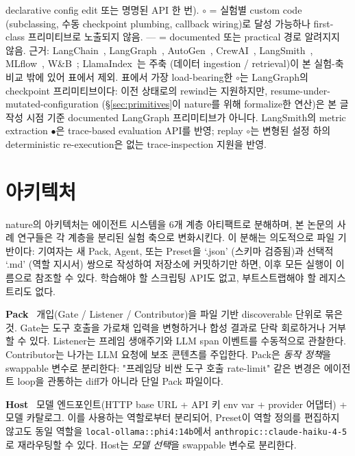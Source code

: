 \documentclass[11pt,a4paper]{article}
\begin{document}
\begin{table}[H]
{declarative config edit 또는 명명된 API 한 번). $\circ$ =
실험별 custom code (subclassing, 수동 checkpoint plumbing,
callback wiring)로 달성 가능하나 first-class 프리미티브로
노출되지 않음. --- = documented 또는 practical 경로 알려지지 않음.
근거: LangChain~\cite{langchain}, LangGraph~\cite{langgraph},
AutoGen~\cite{autogen}, CrewAI~\cite{crewai},
LangSmith~\cite{langsmith}, MLflow~\cite{mlflow},
W\&B~\cite{wandb}; LlamaIndex~\cite{llamaindex}는 주축 (데이터
ingestion / retrieval)이 본 실험-축 비교 밖에 있어 표에서 제외.
표에서 가장 load-bearing한 $\circ$는 LangGraph의 checkpoint
프리미티브이다: 이전 상태로의 rewind는 지원하지만, resume-under-
mutated-configuration (\S\ref{sec:primitives}이 nature를 위해
formalize한 연산)은 본 글 작성 시점 기준 documented LangGraph
프리미티브가 아니다. LangSmith의 metric extraction $\bullet$은
trace-based evaluation API를 반영; replay $\circ$는 변형된 설정
하의 deterministic re-execution은 없는 trace-inspection 지원을
반영.}
\label{tab:related-comparison}
\end{table}

\section{아키텍처}
\label{sec:architecture}

nature의 아키텍처는 에이전트 시스템을 6개 계층 아티팩트로 분해하며,
본 논문의 사례 연구들은 각 계층을 분리된 실험 축으로 변화시킨다. 이
분해는 의도적으로 파일 기반이다: 기여자는 새 Pack, Agent, 또는 Preset을
`.json' (스키마 검증됨)과 선택적 `.md' (역할 지시서) 쌍으로 작성하여
저장소에 커밋하기만 하면, 이후 모든 실행이 이름으로 참조할 수 있다.
학습해야 할 스크립팅 API도 없고, 부트스트랩해야 할 레지스트리도 없다.

\textbf{Pack} \textemdash\ 개입(Gate / Listener / Contributor)을 파일 기반
discoverable 단위로 묶은 것. Gate는 도구 호출을 가로채 입력을 변형하거나
합성 결과로 단락 회로하거나 거부할 수 있다. Listener는 프레임 생애주기와
LLM span 이벤트를 수동적으로 관찰한다. Contributor는 나가는 LLM 요청에
보조 콘텐츠를 주입한다. Pack은 \emph{동작 정책}을 swappable 변수로
분리한다: "프레임당 비싼 도구 호출 rate-limit" 같은 변경은 에이전트
loop을 관통하는 diff가 아니라 단일 Pack 파일이다.

\textbf{Host} \textemdash\ 모델 엔드포인트(HTTP base URL + API 키 env var +
provider 어댑터) + 모델 카탈로그. 이를 사용하는 역할로부터 분리되어,
Preset이 역할 정의를 편집하지 않고도 동일 역할을
\texttt{local-ollama::phi4:14b}에서 \texttt{anthropic::claude-haiku-4-5}로
재라우팅할 수 있다. Host는 \emph{모델 선택}을 swappable 변수로 분리한다.
\end{document}
